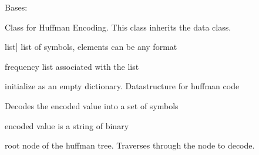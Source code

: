 \documentclass[letterpaper,10pt,english]{sphinxmanual}
\begin{document}
\begin{fulllineitems}
\label{\detokenize{huffman:huffman.Huffman}}
\pysigstartsignatures
{}
\pysigstopsignatures
\sphinxAtStartPar
Bases: {\hyperref[\detokenize{core:core.data.Data}]{}}

\sphinxAtStartPar
Class for Huffman Encoding. This class inherits the data class.
\begin{description}
\begin{description}
\sphinxlineitem{symbols}{[}list{]}
\sphinxAtStartPar
list of symbols, elements can be any format

\sphinxAtStartPar
frequency list associated with the list

\sphinxAtStartPar
initialize as an empty dictionary. Datastructure for huffman code

\end{description}

\end{description}

\begin{fulllineitems}
\label{\detokenize{huffman:huffman.Huffman.decode}}
\pysigstartsignatures
{}
\pysigstopsignatures
\sphinxAtStartPar
Decodes the encoded value into a set of symbols
\begin{description}
\begin{description}
\sphinxAtStartPar
encoded value is a string of binary

\sphinxAtStartPar
root node of the huffman tree. Traverses through the node to decode.


\end{description}
\end{description}
\end{fulllineitems}
\end{fulllineitems}
\end{document}

